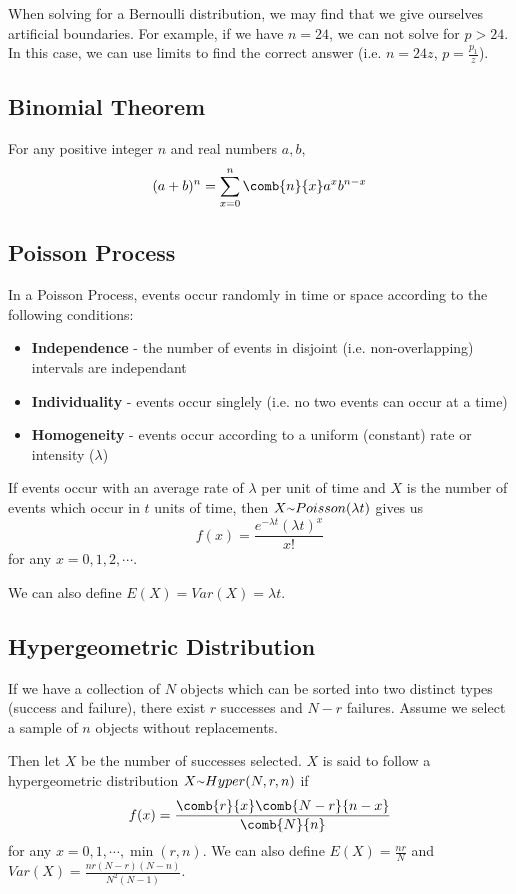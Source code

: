 \documentclass[12pt]{article}
\begin{document}
When solving for a Bernoulli distribution, we may find that we give ourselves artificial boundaries. For example, if we have $n = 24$, we can not solve for $p > 24$. In this case, we can use limits to find the correct answer (i.e. $n = 24z$, $p = \frac{p_1}{z}$).

\subsection*{Binomial Theorem}
For any positive integer $n$ and real numbers $a,b$, \[ (a+b)^n = \sum_{x=0}^n \comb{n}{x} a^xb^{n-x} \]

\subsection*{Poisson Process}
In a Poisson Process, events occur randomly in time or space according to the following conditions:
\begin{itemize}
\item {\bf Independence} - the number of events in disjoint (i.e. non-overlapping) intervals are independant
\item {\bf Individuality} - events occur singlely (i.e. no two events can occur at a time)
\item {\bf Homogeneity} - events occur according to a uniform (constant) rate or intensity ($\lambda$)
\end{itemize}

If events occur with an average rate of $\lambda$ per unit of time and $X$ is the number of events which occur in $t$ units of time, then $X \ttilde Poisson(\lambda t)$ gives us \[ f(x) = \frac{e^{-\lambda t} (\lambda t)^x}{x!} \] for any $x = 0, 1, 2, \cdots$.

We can also define $E(X) = Var(X) = \lambda t$.

\subsection*{Hypergeometric Distribution}
If we have a collection of $N$ objects which can be sorted into two distinct types (success and failure), there exist $r$ successes and $N - r$ failures. Assume we select a sample of $n$ objects without replacements.

Then let $X$ be the number of successes selected. $X$ is said to follow a hypergeometric distribution $X \ttilde Hyper(N, r, n)$ if \[ f(x) = \frac{\comb{r}{x} \comb{N-r}{n-x}}{\comb{N}{n}} \] for any $x = 0, 1, \cdots, \min(r,n)$. We can also define $E(X) = \frac{nr}{N}$ and $Var(X) = \frac{nr(N - r)(N - n)}{N^2(N - 1)}$.
\end{document}
